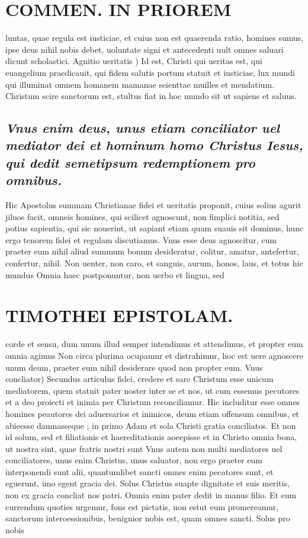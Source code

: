 \documentclass{article}
\begin{document}
\begin{pages}
\section*{COMMEN. IN PRIOREM }
\marginpar{[ p.48 ]}\pstart luntas, quae regula est iusticiae, et cuius non est quaerenda ratio, homines sumus, ipse deus nihil nobis debet, uoluntate signi et antecedenti uult omnes saluari dicunt scholastici.  \pend\pstart Agnitio ueritatis ) Id est, Christi qui ueritas est, qui euangelium praedicauit, qui fidem salutis portum statuit et iusticiae, lux mundi qui illuminat omnem homanem mamanae seienttae muilles et mendatium. Christum scire sanctorum est, stultus fiat in hoc mundo sit ut sapiens et saluus.  \pend
{}
{}
\subsection*{\textit{Vnus enim deus, unus etiam conciliator uel mediator dei et hominum homo Christus Iesus, qui dedit semetipsum redemptionem pro omnibus. }}\pstart Hic Apostolus summam Christianae fidei et ueritatis proponit, cuius solius agurit jiluos facit, omneis homines, qui scilicet agnoscunt, non fimplici notitia, sed potius sapientia, qui sic nouerint, ut sapiant etiam quam suauis sit dominus, hunc ergo tenorem fidei et regulam discutiamus.  \pend\pstart Vnus esse deus agnoscitur, cum praeter eum nihil aliud summum bonum desideratur, colitur, amatur, antefertur, confertur, nihil. Non uenter, non caro, et sanguis, aurum, honos, laus, et totus hic mundus Omnia haec postponuntur, non uerbo et lingua, sed  \pend
\section*{TIMOTHEI EPISTOLAM. }
\marginpar{[ p.49 ]}\pstart corde et sensu, dum unum illud semper intendimus et attendimus, et propter eum omnia agimus Non circa plurima ocupamur et distrahimur, hoc est uere agnoscere unum deum, praeter eum nihil desiderare quod non propter eum.  \pend\pstart Vnus concliator) Secundus articulus fidei, credere et sare Christum esse unicum mediatorem, quem statuit pater noster inter se et nos, ut cum essemus pecutores et a deo proiecti et inimia per Christum reconciliamur. Hic includitur esse omnes homines peautores dei aduersarios et inimicos, deum etiam offensum omnibus, et abiecsse damnasseque ; in primo Adam et sola Christi gratia conciliatos. Et non id solum, sed et filiationis et haereditationis aoeepisse et in Christo omnia bona, ut nostra sint, quae fratris nostri sunt Vnus autem non multi mediatores uel conciliatores, unus enim Christus, unus saluator, non ergo praeter eum interponendi sunt alii, quantumlibet sancti omnes enim pecatores sunt, et eguerunt, imo egent gracia dei. Solus Christus suapte dignitate et suis meritis, non ex gracia concliat nos patri. Omnia enim pater dedit in manus filio. Et eum currendum quoties urgemur, fons est pictatis, non estut eum promereamur, sanctorum interoessionibus, benignior nobis est, quam omnes sancti. Solus pro nobis  \pend

\end{pages}
\end{document}
